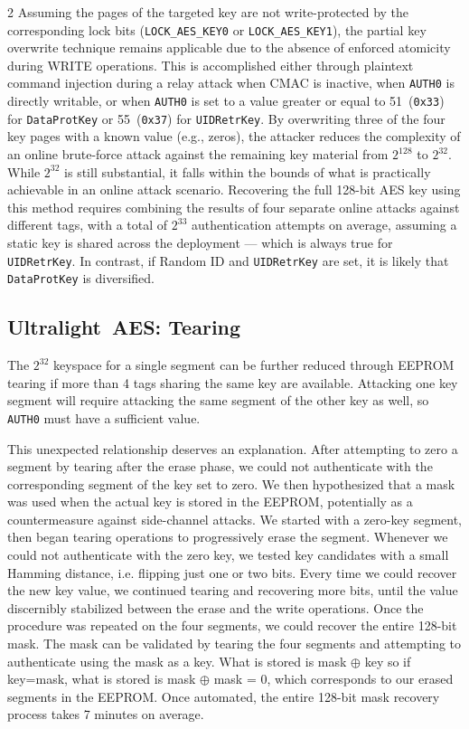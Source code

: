\documentclass[10pt,letterpaper]{article}
\begin{document}
\begin{multicols}{2}
Assuming the pages of the targeted key are not write-protected by the corresponding lock bits (\texttt{LOCK\_AES\_KEY0} or \texttt{LOCK\_AES\_KEY1}), the partial key overwrite technique remains applicable due to the absence of enforced atomicity during WRITE operations. This is accomplished either through plaintext command injection during a relay attack when CMAC is inactive, when \texttt{AUTH0} is directly writable, or when \texttt{AUTH0} is set to a value greater or equal to 51~(\texttt{0x33}) for \texttt{DataProtKey} or 55~(\texttt{0x37}) for \texttt{UIDRetrKey}. By overwriting three of the four key pages with a known value (e.g., zeros), the attacker reduces the complexity of an online brute-force attack against the remaining key material from \(2^{128}\) to \(2^{32}\). While \(2^{32}\) is still substantial, it falls within the bounds of what is practically achievable in an online attack scenario. Recovering the full 128-bit AES key using this method requires combining the results of four separate online attacks against different tags, with a total of \(2^{33}\) authentication attempts on average, assuming a static key is shared across the deployment --- which is always true for \texttt{UIDRetrKey}. In contrast, if Random ID and \texttt{UIDRetrKey} are set, it is likely that \texttt{DataProtKey} is diversified.

\subsection{Ultralight~AES: Tearing}
\label{sec:aes_tearing}
The $2^{32}$ keyspace for a single segment can be further reduced through EEPROM tearing if more than 4 tags sharing the same key are available. Attacking one key segment will require attacking the same segment of the other key as well, so \texttt{AUTH0} must have a sufficient value.

This unexpected relationship deserves an explanation.
After attempting to zero a segment by tearing after the erase phase, we could not authenticate with the corresponding segment of the key set to zero. We then hypothesized that a mask was used when the actual key is stored in the EEPROM, potentially as a countermeasure against side-channel attacks.
We started with a zero-key segment, then began tearing operations to progressively erase the segment. Whenever we could not authenticate with the zero key, we tested key candidates with a small Hamming distance, i.e. flipping just one or two bits. Every time we could recover the new key value, we continued tearing and recovering more bits, until the value discernibly stabilized between the erase and the write operations.
Once the procedure was repeated on the four segments, we could recover the entire 128-bit mask. The mask can be validated by tearing the four segments and attempting to authenticate using the mask as a key. What is stored is mask $\oplus$ key so if key=mask, what is stored is mask $\oplus$ mask = 0, which corresponds to our erased segments in the EEPROM.
Once automated, the entire 128-bit mask recovery process takes 7 minutes on average. 


\end{multicols}
\end{document}
